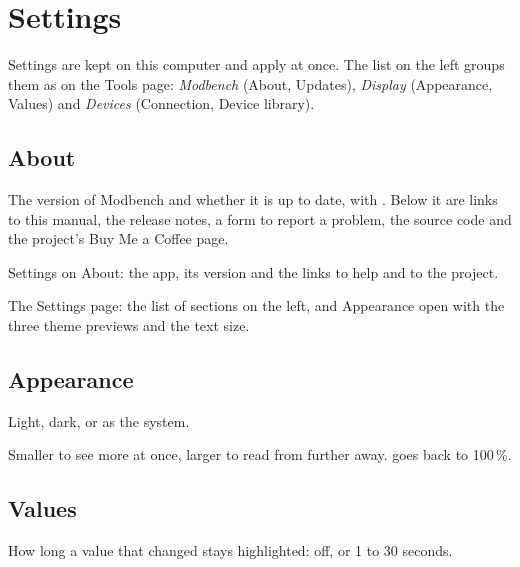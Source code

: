 \chapter{Settings}
\label{ch:settings}

Settings are kept on this computer and apply at once. The list on the left
groups them as on the Tools page: \emph{Modbench} (About, Updates),
\emph{Display} (Appearance, Values) and \emph{Devices} (Connection, Device
library).

\section{About}

The version of Modbench and whether it is up to date, with . Below it are links to this manual, the release notes, a form to
report a problem, the source code and the project's Buy Me a Coffee page.

  {Settings on About: the app, its version and the links to help and to the
   project.}

  {The Settings page: the list of sections on the left, and Appearance open
   with the three theme previews and the text size.}

\section{Appearance}

\begin{description}[style=nextline, leftmargin=0pt, font=\intermedium]
  \item[Theme] Light, dark, or as the system.
  \item[Text size] Smaller to see more at once, larger to read from further
    away.  goes back to 100\,\%.
\end{description}

\section{Values}

\begin{description}[style=nextline, leftmargin=0pt, font=\intermedium]
  \item[Highlight changed values] How long a value that changed stays
    highlighted: off, or 1 to 30 seconds.
\end{description}

